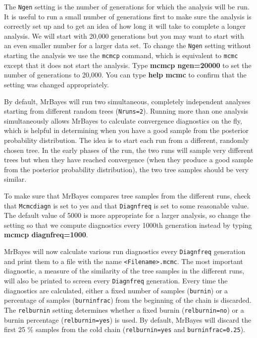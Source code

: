 \documentclass[12pt]{book}
\begin{document}
The \texttt{Ngen} setting is the number of generations for which the analysis will be run. It is
useful to run a small number of generations first to make sure the analysis is correctly set up and
to get an idea of how long it will take to complete a longer analysis. We will start with 20,000
generations but you may want to start with an even smaller number for a larger data set. To change
the \texttt{Ngen} setting without starting the analysis we use the \texttt{mcmcp} command, which is
equivalent to \texttt{mcmc} except that it does not start the analysis. Type \textbf{mcmcp
ngen=20000} to set the number of generations to 20,000. You can type \textbf{help mcmc} to confirm
that the setting was changed appropriately.

By default, MrBayes will run two simultaneous, completely independent analyses starting from
different random trees (\texttt{Nruns=2}). Running more than one analysis simultaneously allows
MrBayes to calculate convergence diagnostics on the fly, which is helpful in determining when you
have a good sample from the posterior probability distribution. The idea is to start each run from
a different, randomly chosen tree.  In the early phases of the run, the two runs will sample very
different trees but when they have reached convergence (when they produce a good sample from the
posterior probability distribution), the two tree samples should be very similar.

To make sure that MrBayes compares tree samples from the different runs, check that
\texttt{Mcmcdiagn} is set to yes and that \texttt{Diagnfreq} is set to some reasonable value. The
default value of 5000 is more appropriate for a larger analysis, so change the setting so that we
compute diagnostics every 1000th generation instead by typing \textbf{mcmcp diagnfreq=1000}.

MrBayes will now calculate various run diagnostics every \texttt{Diagnfreq} generation and print
them to a file with the name \texttt{<Filename>.mcmc}. The most important diagnostic, a measure of
the similarity of the tree samples in the different runs, will also be printed to screen every
\texttt{Diagnfreq} generation.  Every time the diagnostics are calculated, either a fixed number of
samples (\texttt{burnin}) or a percentage of samples (\texttt{burninfrac}) from the beginning of
the chain is discarded.  The \texttt{relburnin} setting determines whether a fixed burnin
(\texttt{relburnin=no}) or a burnin percentage (\texttt{relburnin=yes}) is used. By default,
MrBayes will discard the first 25 \% samples from the cold chain (\texttt{relburnin=yes} and
\texttt{burninfrac=0.25}).
\end{document}
